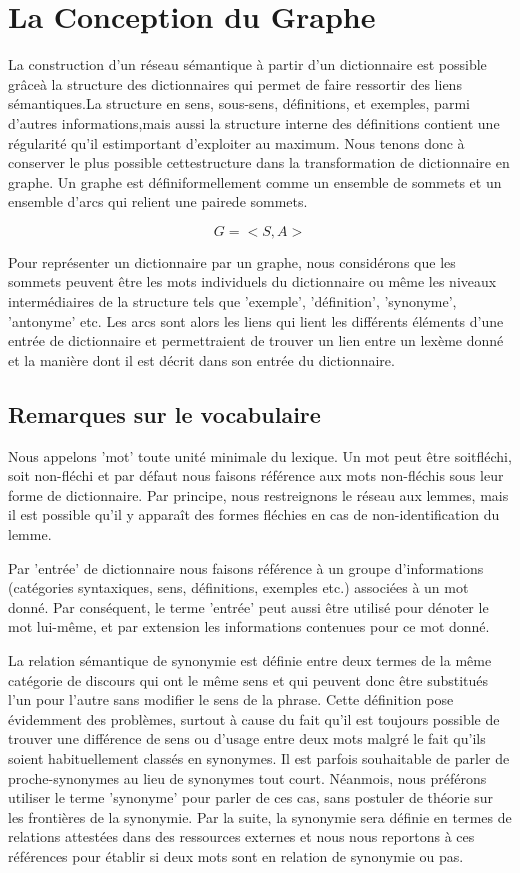 \section{La Conception du Graphe}

La construction d'un réseau sémantique à partir d'un dictionnaire est possible 
grâceà la structure des dictionnaires qui permet de faire ressortir des liens 
sémantiques.La structure en sens, sous-sens, définitions, et exemples, parmi 
d'autres informations,mais aussi la structure interne des définitions contient 
une régularité qu'il estimportant d'exploiter au maximum. Nous tenons donc à 
conserver le plus possible cettestructure dans la transformation de dictionnaire 
en graphe. Un graphe est définiformellement comme un ensemble de sommets et un 
ensemble d'arcs qui relient une pairede sommets.

\[
G = <S, A>
\]

Pour représenter un dictionnaire par un graphe, nous considérons que les 
sommets peuvent être les mots individuels du dictionnaire ou même les niveaux 
intermédiaires de la structure tels que 'exemple', 'définition', 'synonyme', 
'antonyme' etc. Les arcs sont alors les liens qui lient les différents éléments 
d'une entrée de dictionnaire et permettraient de trouver un lien entre un 
lexème donné et la manière dont il est décrit dans son entrée du dictionnaire.

\subsection{Remarques sur le vocabulaire}
Nous appelons 'mot' toute unité minimale du lexique. Un mot peut être
soitfléchi, soit non-fléchi et par défaut nous faisons référence aux mots 
non-fléchis sous leur forme de dictionnaire. Par principe, nous restreignons le 
réseau aux lemmes, mais il est possible qu'il y apparaît des formes fléchies en 
cas de non-identification du lemme.

Par 'entrée' de dictionnaire nous faisons référence à un groupe d'informations 
(catégories syntaxiques, sens, définitions, exemples etc.) associées à un mot 
donné. Par conséquent, le terme 'entrée' peut aussi être utilisé pour dénoter 
le mot lui-même, et par extension les informations contenues pour ce mot donné.

La relation sémantique de synonymie est définie entre deux termes de la même 
catégorie de discours qui ont le même sens et qui peuvent donc être substitués 
l'un pour l'autre sans modifier le sens de la phrase. Cette définition pose 
évidemment des problèmes, surtout à cause du fait qu'il est toujours possible 
de trouver une différence de sens ou d'usage entre deux mots malgré le fait 
qu'ils soient habituellement classés en synonymes. Il est parfois souhaitable 
de parler de proche-synonymes au lieu de synonymes tout court. Néanmois, 
nous préférons utiliser le terme 'synonyme' pour parler de ces cas, sans 
postuler de théorie sur les frontières de la synonymie. Par la suite, la 
synonymie sera définie en termes de relations attestées dans des ressources 
externes et nous nous reportons à ces références pour établir si deux mots sont 
en relation de synonymie ou pas.

